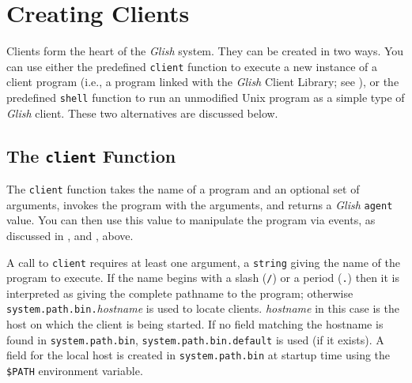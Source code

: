 \section{Creating Clients}
\label{clients}

Clients form the heart of the {\em Glish} system.  They can be 
created in two
ways.  You can use either the predefined {\tt client} function to execute
a new instance of a client program (i.e., a program linked with 
the {\em Glish}
Client Library; see ), or the predefined {\tt shell}
function to run an unmodified {\sc Unix} program as a simple type of {\em Glish}
client.  These two alternatives are discussed below.

\subsection{The {\tt client} Function}
\label{client-func-long}

The {\tt client} function takes the name of a program and an optional
set of arguments, invokes the program with the arguments, and returns
a {\em Glish} {\tt agent} value.   You can then use this value  
to manipulate the
program via events, as discussed in , and ,
above.

A call to {\tt client} requires at least one argument, a {\tt string}
giving the name of the program to execute.  If the name begins with
a slash ({\tt /}) or a period ({\tt .}) then it is interpreted as
giving the complete pathname to the program; otherwise
{\tt system.path.bin.}{\em hostname} is used to locate clients.
\label{system-path-bin} {\em hostname} in this case is the host on
which the client is being started. If no field matching the hostname
is found in {\tt system.path.bin}, \verb+system.path.bin.default+ is
used (if it exists). A field for the local host is created in
\verb+system.path.bin+ at startup time using the {\tt \$PATH} environment
variable.

